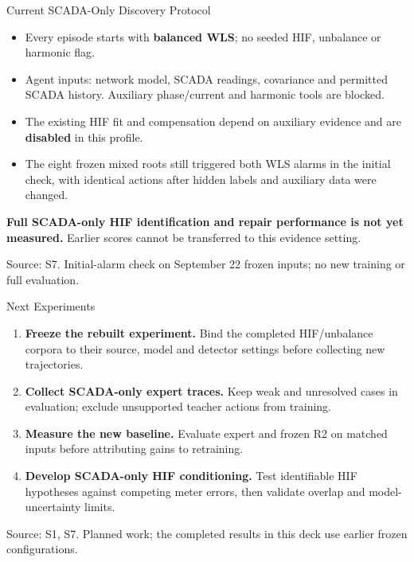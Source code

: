 \documentclass{beamer}
\newcommand{\src}[1]{\par\vfill\begin{minipage}{0.67\textwidth}\tiny\color{gray}Source: #1.\end{minipage}\par}
\begin{document}
\begin{frame}{Current SCADA-Only Discovery Protocol}
  \begin{itemize}
    \setlength\itemsep{0.65em}
    \item Every episode starts with \textbf{balanced WLS}; no seeded HIF, unbalance or harmonic flag.
    \item Agent inputs: network model, SCADA readings, covariance and permitted SCADA history. Auxiliary phase/current and harmonic tools are blocked.
    \item The existing HIF fit and compensation depend on auxiliary evidence and are \textbf{disabled} in this profile.
    \item The eight frozen mixed roots still triggered both WLS alarms in the initial check, with identical actions after hidden labels and auxiliary data were changed.
  \end{itemize}
  \vspace{0.5em}
  \textbf{Full SCADA-only HIF identification and repair performance is not yet measured.} Earlier scores cannot be transferred to this evidence setting.
  \src{S7. Initial-alarm check on September 22 frozen inputs; no new training or full evaluation}
\end{frame}

\begin{frame}{Next Experiments}
  \begin{enumerate}
    \setlength\itemsep{0.9em}
    \item \textbf{Freeze the rebuilt experiment.} Bind the completed HIF/unbalance corpora to their source, model and detector settings before collecting new trajectories.
    \item \textbf{Collect SCADA-only expert traces.} Keep weak and unresolved cases in evaluation; exclude unsupported teacher actions from training.
    \item \textbf{Measure the new baseline.} Evaluate expert and frozen R2 on matched inputs before attributing gains to retraining.
    \item \textbf{Develop SCADA-only HIF conditioning.} Test identifiable HIF hypotheses against competing meter errors, then validate overlap and model-uncertainty limits.
  \end{enumerate}
  \src{S1, S7. Planned work; the completed results in this deck use earlier frozen configurations}
\end{frame}
\end{document}

